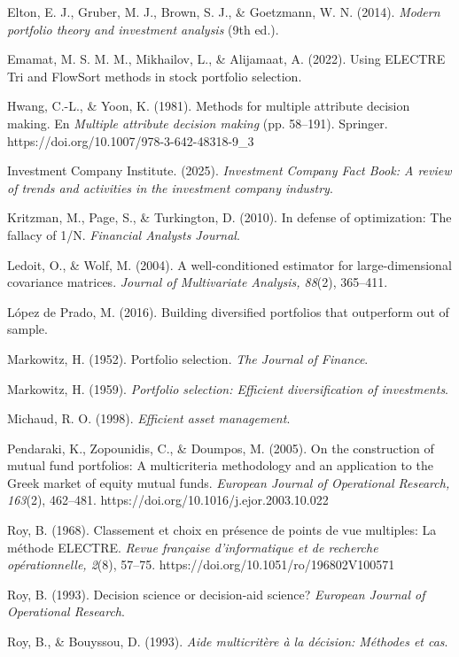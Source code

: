 \documentclass[12pt,letterpaper]{article}
\newcommand{\apa}[1]{\begingroup\sloppy\hangindent=1.25cm\hangafter=1 #1\par\vspace{0.35em}\endgroup}
\begin{document}
\apa{Elton, E. J., Gruber, M. J., Brown, S. J., \& Goetzmann, W. N. (2014). \textit{Modern portfolio theory and investment analysis} (9th ed.).}

\apa{Emamat, M. S. M. M., Mikhailov, L., \& Alijamaat, A. (2022). Using ELECTRE Tri and FlowSort methods in stock portfolio selection.}

\apa{Hwang, C.-L., \& Yoon, K. (1981). Methods for multiple attribute decision making. En \textit{Multiple attribute decision making} (pp. 58--191). Springer. https://doi.org/10.1007/978-3-642-48318-9\_3}

\apa{Investment Company Institute. (2025). \textit{Investment Company Fact Book: A review of trends and activities in the investment company industry}.}

\apa{Kritzman, M., Page, S., \& Turkington, D. (2010). In defense of optimization: The fallacy of 1/N. \textit{Financial Analysts Journal}.}

\apa{Ledoit, O., \& Wolf, M. (2004). A well-conditioned estimator for large-dimensional covariance matrices. \textit{Journal of Multivariate Analysis, 88}(2), 365--411.}

\apa{López de Prado, M. (2016). Building diversified portfolios that outperform out of sample.}

\apa{Markowitz, H. (1952). Portfolio selection. \textit{The Journal of Finance}.}

\apa{Markowitz, H. (1959). \textit{Portfolio selection: Efficient diversification of investments}.}

\apa{Michaud, R. O. (1998). \textit{Efficient asset management}.}

\apa{Pendaraki, K., Zopounidis, C., \& Doumpos, M. (2005). On the construction of mutual fund portfolios: A multicriteria methodology and an application to the Greek market of equity mutual funds. \textit{European Journal of Operational Research, 163}(2), 462--481. https://doi.org/10.1016/j.ejor.2003.10.022}

\apa{Roy, B. (1968). Classement et choix en présence de points de vue multiples: La méthode ELECTRE. \textit{Revue française d'informatique et de recherche opérationnelle, 2}(8), 57--75. https://doi.org/10.1051/ro/196802V100571}

\apa{Roy, B. (1993). Decision science or decision-aid science? \textit{European Journal of Operational Research}.}

\apa{Roy, B., \& Bouyssou, D. (1993). \textit{Aide multicritère à la décision: Méthodes et cas}.}
\end{document}
